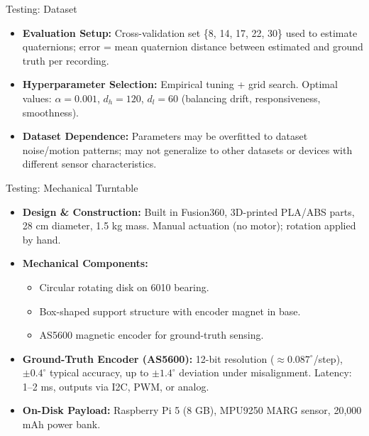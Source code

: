\documentclass[aspectratio=169,xcolor=dvipsnames]{beamer}
\begin{document}
\begin{frame}{Testing: Dataset}
  \begin{itemize}[<+->]
    \item \textbf{Evaluation Setup:}  
    Cross-validation set \{8, 14, 17, 22, 30\} used to estimate quaternions; error = mean quaternion distance between estimated and ground truth per recording.
    
    \item \textbf{Hyperparameter Selection:}  
    Empirical tuning + grid search.  
    Optimal values: $\alpha = 0.001$, $d_h = 120$, $d_l = 60$ (balancing drift, responsiveness, smoothness).
    
    \item \textbf{Dataset Dependence:}  
    Parameters may be overfitted to dataset noise/motion patterns; may not generalize to other datasets or devices with different sensor characteristics.
\end{itemize}

\end{frame}

\begin{frame}{Testing: Mechanical Turntable}
  \begin{itemize}
      \item<1-> \textbf{Design \& Construction:}  
      Built in Fusion360, 3D-printed PLA/ABS parts, 28 cm diameter, 1.5 kg mass.  
      Manual actuation (no motor); rotation applied by hand.
  
      \item<2-> \textbf{Mechanical Components:}  
      \begin{itemize}
          \item Circular rotating disk on 6010 bearing.  
          \item Box-shaped support structure with encoder magnet in base.  
          \item AS5600 magnetic encoder for ground-truth sensing.
      \end{itemize}
  
      \item<3-> \textbf{Ground-Truth Encoder (AS5600):}  
      12-bit resolution ($\approx 0.087^{\circ}$/step), $\pm 0.4^{\circ}$ typical accuracy, up to $\pm 1.4^{\circ}$ deviation under misalignment.  
      Latency: 1--2 ms, outputs via I2C, PWM, or analog.
  
      \item<4-> \textbf{On-Disk Payload:}  
      Raspberry Pi 5 (8 GB), MPU9250 MARG sensor, 20,000 mAh power bank.
  \end{itemize}
  \end{frame}
\end{document}
